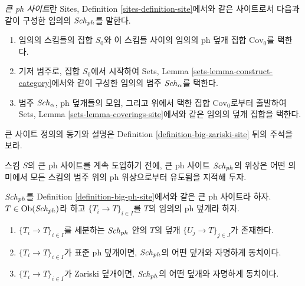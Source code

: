 \begin{definition}
\label{definition-big-ph-site}
{\it 큰 ph 사이트}란 Sites, Definition \ref{sites-definition-site}에서와
같은 사이트로서 다음과 같이 구성한 임의의 $\mathit{Sch}_{ph}$를 말한다.
\begin{enumerate}
\item 임의의 스킴들의 집합 $S_0$와 이 스킴들 사이의 임의의 ph 덮개
집합 $\text{Cov}_0$를 택한다.
\item 기저 범주로, 집합 $S_0$에서 시작하여 Sets, Lemma
\ref{sets-lemma-construct-category}에서와 같이 구성한 임의의 범주
$\mathit{Sch}_\alpha$를 택한다.
\item 범주 $\mathit{Sch}_\alpha$, ph 덮개들의 모임, 그리고 위에서 택한 집합
$\text{Cov}_0$로부터 출발하여 Sets, Lemma
\ref{sets-lemma-coverings-site}에서와 같은 임의의 덮개 집합을 택한다.
\end{enumerate}
\end{definition}

\noindent
큰 사이트 정의의 동기와 설명은 Definition
\ref{definition-big-zariski-site} 뒤의 주석을 보라.

\medskip\noindent
스킴 $S$의 큰 ph 사이트를 계속 도입하기 전에, 큰 ph 사이트
$\mathit{Sch}_{ph}$의 위상은 어떤 의미에서 모든 스킴의 범주 위의 ph 위상으로부터
유도됨을 지적해 두자.

\begin{lemma}
\label{lemma-ph-induced}
$\mathit{Sch}_{ph}$를 Definition \ref{definition-big-ph-site}에서와 같은 큰 ph
사이트라 하자. $T \in \mathop{\mathrm{Ob}}\nolimits(\mathit{Sch}_{ph})$라 하고
$\{T_i \to T\}_{i \in I}$를 $T$의 임의의 ph 덮개라 하자.
\begin{enumerate}
\item $\{T_i \to T\}_{i \in I}$를 세분하는 $\mathit{Sch}_{ph}$ 안의 $T$의 덮개
$\{U_j \to T\}_{j \in J}$가 존재한다.
\item $\{T_i \to T\}_{i \in I}$가 표준 ph 덮개이면, $\mathit{Sch}_{ph}$의 어떤
덮개와 자명하게 동치이다.
\item $\{T_i \to T\}_{i \in I}$가 Zariski 덮개이면, $\mathit{Sch}_{ph}$의 어떤
덮개와 자명하게 동치이다.
\end{enumerate}
\end{lemma}

